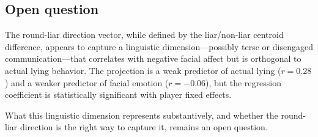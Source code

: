 \documentclass[11pt]{article}
\begin{document}
\subsection{Open question}

The round-liar direction vector, while defined by the liar/non-liar centroid difference, appears to capture a linguistic dimension---possibly terse or disengaged communication---that correlates with negative facial affect but is orthogonal to actual lying behavior. The projection is a weak predictor of actual lying ($r = 0.28$) and a weaker predictor of facial emotion ($r = -0.06$), but the regression coefficient is statistically significant with player fixed effects.

What this linguistic dimension represents substantively, and whether the round-liar direction is the right way to capture it, remains an open question.
\end{document}

